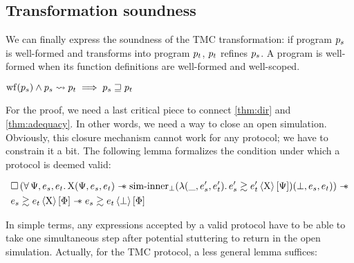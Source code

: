 \subsection{Transformation soundness}

We can finally express the soundness of the TMC transformation: if program $\datalangProg_s$ is well-formed and transforms into program $\datalangProg_t$, $\datalangProg_t$ refines $\datalangProg_s$.
A program is well-formed when its function definitions are well-formed and well-scoped.

\begin{theorem} \label{thm:soundness}
    $
        \wf{\datalangProg_s} \wedge \datalangProg_s \tmc \datalangProg_t \implies
        \datalangProg_s \refined \datalangProg_t
    $
\end{theorem}

For the proof, we need a last critical piece to connect \cref{thm:dir} and \cref{thm:adequacy}.
In other words, we need a way to close an open simulation.
Obviously, this closure mechanism cannot work for any protocol; we have to constrain it a bit.
The following lemma formalizes the condition under which a protocol is deemed valid:

\begin{lemma}
    \begin{align*}
            &
            \iPersistent \left(
                \forall \iPredTwo, \datalangExpr_s, \datalangExpr_t \ldotp
                \iProt (\iPredTwo, \datalangExpr_s, \datalangExpr_t) \iWand
                \mathrm{sim \mathhyphen inner}_\bot (\lambdaAbs (\_, \datalangExpr_s', \datalangExpr_t') \ldotp \iSim[\iProt]{\iPredTwo}{\datalangExpr_s'}{\datalangExpr_t'}) (\bot, \datalangExpr_s, \datalangExpr_t)
            \right) \iWand
        \\
            &
            \iSim[\iProt]{\iPred}{\datalangExpr_s}{\datalangExpr_t} \iWand
            \iSim[\bot]{\iPred}{\datalangExpr_s}{\datalangExpr_t}
    \end{align*}
\end{lemma}

In simple terms, any expressions accepted by a valid protocol have to be able to take one simultaneous step after potential stuttering to return in the open simulation.
Actually, for the TMC protocol, a less general lemma suffices:

